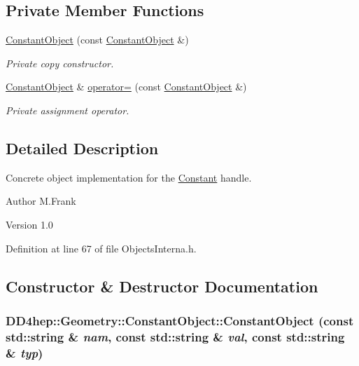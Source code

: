 \subsection*{Private Member Functions}
\begin{DoxyCompactItemize}
\item 
\hyperlink{class_d_d4hep_1_1_geometry_1_1_constant_object_a9bc01ddd3487fdaf76be43bce415e0e9}{ConstantObject} (const \hyperlink{class_d_d4hep_1_1_geometry_1_1_constant_object}{ConstantObject} \&)
\begin{DoxyCompactList}\small\item\em Private copy constructor. \item\end{DoxyCompactList}\item 
\hyperlink{class_d_d4hep_1_1_geometry_1_1_constant_object}{ConstantObject} \& \hyperlink{class_d_d4hep_1_1_geometry_1_1_constant_object_acd8082f3aab755887e4bb77f1b730cf3}{operator=} (const \hyperlink{class_d_d4hep_1_1_geometry_1_1_constant_object}{ConstantObject} \&)
\begin{DoxyCompactList}\small\item\em Private assignment operator. \item\end{DoxyCompactList}\end{DoxyCompactItemize}


\subsection{Detailed Description}
Concrete object implementation for the \hyperlink{class_d_d4hep_1_1_geometry_1_1_constant}{Constant} handle. \begin{DoxyAuthor}{Author}
M.Frank 
\end{DoxyAuthor}
\begin{DoxyVersion}{Version}
1.0 
\end{DoxyVersion}


Definition at line 67 of file ObjectsInterna.h.

\subsection{Constructor \& Destructor Documentation}
\hypertarget{class_d_d4hep_1_1_geometry_1_1_constant_object_ac91134bd94fcfc9599b6c53a6b2e11f7}{
\subsubsection[{ConstantObject}]{\setlength{\rightskip}{0pt plus 5cm}DD4hep::Geometry::ConstantObject::ConstantObject (const std::string \& {\em nam}, \/  const std::string \& {\em val}, \/  const std::string \& {\em typ})}}
\label{class_d_d4hep_1_1_geometry_1_1_constant_object_ac91134bd94fcfc9599b6c53a6b2e11f7}


